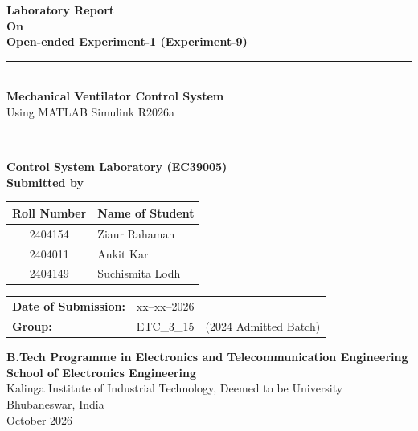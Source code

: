 \documentclass[12pt,a4paper]{article}
\begin{document}
\begin{titlepage}
\thispagestyle{empty}
\begin{center}

\vspace*{0.5cm}

{\LARGE \textbf{Laboratory Report}}\\[0.3cm]
{\Large \textbf{On}}\\[0.3cm]
{\LARGE \textbf{Open-ended Experiment-1 (Experiment-9)}}\\[1.2cm]

\rule{\linewidth}{0.8pt}\\[0.4cm]
{\Large \textbf{Mechanical Ventilator Control System}}\\[0.1cm]
{\large Using MATLAB Simulink R2026a}\\[0.4cm]
\rule{\linewidth}{0.8pt}\\[1.2cm]

{\large \textbf{Control System Laboratory (EC39005)}}\\[1.5cm]

{\large \textbf{Submitted by}}\\[0.6cm]

\begin{tabular}{|c|l|}
\hline
\textbf{Roll Number} & \textbf{Name of Student} \\
\hline
2404154 & Ziaur Rahaman \\
\hline
2404011 & Ankit Kar \\
\hline
2404149 & Suchismita Lodh \\
\hline
\end{tabular}

\vspace{1.2cm}

\begin{tabular}{ll}
\textbf{Date of Submission:} & xx--xx--2026 \\[0.3cm]
\textbf{Group:}              & ETC\_3\_15\ \ (2024 Admitted Batch) \\
\end{tabular}

\vfill

{\large \textbf{B.Tech Programme in Electronics and Telecommunication Engineering}}\\[0.2cm]
{\large \textbf{School of Electronics Engineering}}\\[0.2cm]
{\large Kalinga Institute of Industrial Technology, Deemed to be University}\\[0.1cm]
{\large Bhubaneswar, India}\\[0.4cm]
{\large October 2026}

\end{center}
\end{titlepage}
\end{document}
